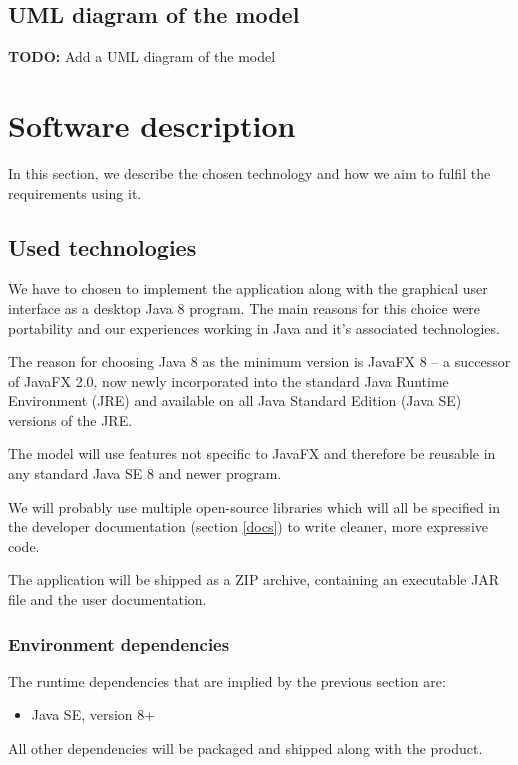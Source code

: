 \documentclass[10pt,a4paper,oneside]{article}
\newcommand{\TODO}[1]{{\textbf{TODO:} #1}} %
\begin{document}
\subsection{UML diagram of the model}

\TODO Add a UML diagram of the model
 
 
 
 
 



\section{Software description}

In this section, we describe the chosen technology and how we aim to fulfil the requirements using it.

\subsection{Used technologies} \label{used-tech}

We have to chosen to implement the application along with the graphical user interface as a
desktop Java 8 program. The main reasons for this choice were portability and our experiences working in Java and it's associated technologies.

The reason for choosing Java 8 as the minimum version is JavaFX 8 -- a successor of JavaFX 2.0, now newly incorporated into
the standard Java Runtime Environment (JRE) and available on all Java Standard Edition (Java SE) versions of the JRE.

The model will use features not specific to JavaFX and therefore be reusable in any standard Java SE 8 and newer program.

We will probably use multiple open-source libraries which will all be specified in the developer documentation (section \ref{docs})
to write cleaner, more expressive code.

The application will be shipped as a ZIP archive, containing an executable JAR file and the user documentation.

\subsubsection{Environment dependencies}

The runtime dependencies that are implied by the previous section are:
\begin{itemize}
\item Java SE, version 8+
\end{itemize}
All other dependencies will be packaged and shipped along with the product.
\end{document}
